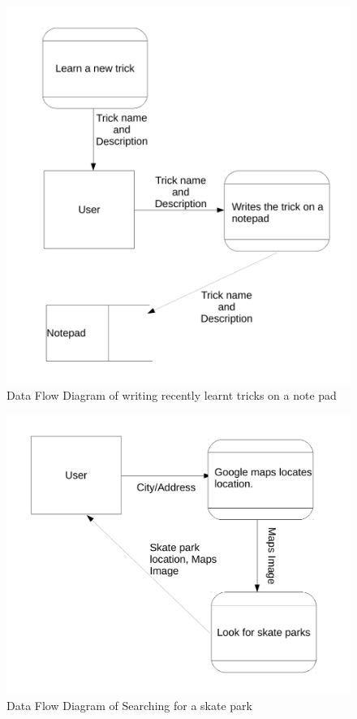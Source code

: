 \begin{figure}[H]
    \includegraphics[width=\textwidth]{./Analysis/WritingTricks.pdf}
    \caption{Data Flow Diagram of writing recently learnt tricks on a note pad} \label{fig:Writing learnt tricks}
\end{figure}

\begin{figure}[H]
    \includegraphics[width=\textwidth]{./Analysis/SearchingForSkatepark.pdf}
    \caption{Data Flow Diagram of Searching for a skate park} \label{fig:Searching for a skate park}
\end{figure}

